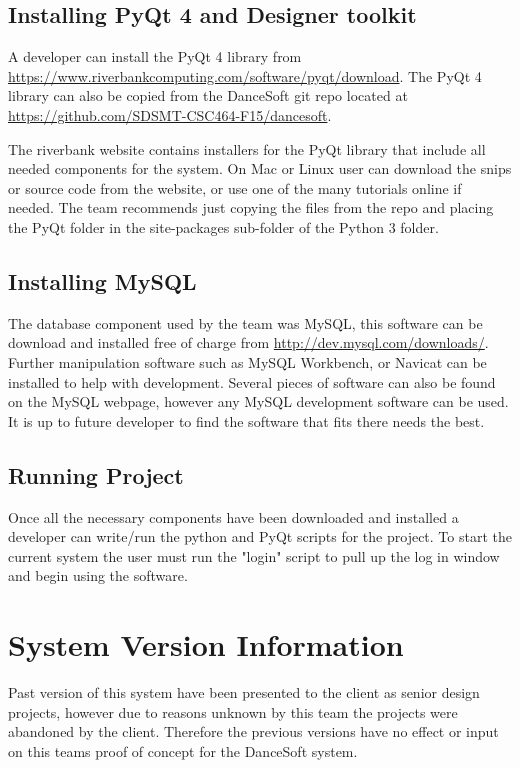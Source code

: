 \subsection{Installing PyQt 4 and Designer toolkit }

A developer can install the PyQt 4 library from \url{https://www.riverbankcomputing.com/software/pyqt/download}. The PyQt 4 library can also be copied from the DanceSoft git repo located at \url{https://github.com/SDSMT-CSC464-F15/dancesoft}.

The riverbank website contains installers for the PyQt library that include all needed components for the system. On Mac or Linux user can download the snips or source code from the website, or use one of the many tutorials online if needed. The team recommends just copying the files from the repo and placing the PyQt folder in the site-packages sub-folder of the Python 3 folder. 

\subsection{Installing MySQL}
The database component used by the team was MySQL, this software can be download and installed free of charge from \url{http://dev.mysql.com/downloads/}. Further manipulation software such as MySQL Workbench, or Navicat can be installed to help with development. Several pieces of  software can also be found on the MySQL webpage, however any MySQL development software can be used. It is up to future developer to find the software that fits there needs the best.

\subsection{Running Project}
Once all the necessary components have been downloaded and installed a developer can write/run the python and PyQt scripts for the project. To start the current system the user must run the "login" script to pull up the log in window and begin using the software. 


\section{System Version Information}
Past version of this system have been presented to the client as senior design projects, however due to reasons unknown by this team the projects were abandoned by the client. Therefore the previous versions have no effect or input on this teams proof of concept for the DanceSoft system. 

